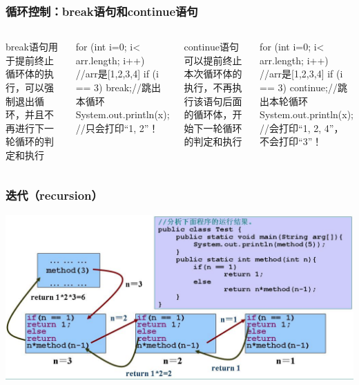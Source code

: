 \begin{frame}[fragile]
  \frametitle{循环控制：break语句和continue语句}
    \begin{columns}
        break语句用于提前终止循环体的执行，可以强制退出循环，并且不再进行下一轮循环的判定和执行
        \begin{javacode}
        for (int i=0; i< arr.length; i++) { //arr是[1,2,3,4]
          if (i == 3) {
            break;//跳出本循环
          }
          System.out.println(x);
        }
        //只会打印“1, 2”！
        \end{javacode}
        continue语句可以提前终止本次循环体的执行，不再执行该语句后面的循环体，开始下一轮循环的判定和执行
        \begin{javacode}
        for (int i=0; i< arr.length; i++) {//arr是[1,2,3,4]
          if (i == 3) {
            continue;//跳出本轮循环
          }
          System.out.println(x);
        }
        //会打印“1, 2, 4”， 不会打印“3”！
        \end{javacode}   
  \end{columns}

\end{frame}

\begin{frame}
  \frametitle{迭代（recursion）}
  \includegraphics[width=\textwidth]{figures/recursion}
\end{frame}
